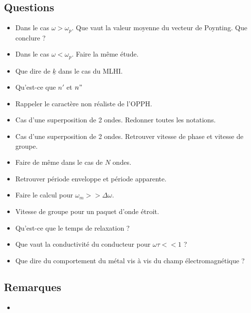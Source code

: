 \documentclass[a4paper, 11pt, hidelinks]{article}
\begin{document}
\subsection{Questions}



\begin{itemize}
    \item Dans le cas $\omega > \omega_p$. Que vaut la valeur moyenne du vecteur de Poynting. Que conclure ? \cite{Chapitre16}
    \item Dans le cas $\omega < \omega_p$. Faire la même étude. \cite{Chapitre16}
    \item Que dire de $\underline{k}$ dans le cas du MLHI. \cite{Chapitre16}
    \item Qu'est-ce que $n'$ et $n"$ \cite{Chapitre16}
    \item Rappeler le caractère non réaliste de l'OPPH. \cite{Chapitre16}
    \item Cas d'une superposition de 2 ondes. Redonner toutes les notations. \cite{Chapitre16}
    \item Cas d'une superposition de 2 ondes. Retrouver vitesse de phase et vitesse de groupe. \cite{Chapitre16}
    \item Faire de même dans le cas de $N$ ondes. \cite{Chapitre16}
    \item Retrouver période enveloppe et période apparente. \cite{Chapitre16}
    \item Faire le calcul pour $\omega_m >> \Delta \omega$. \cite{Chapitre16}
    \item Vitesse de groupe pour un paquet d'onde étroit. \cite{Chapitre16}
    \item Qu'est-ce que le temps de relaxation ? \cite{Chapitre17} 
    \item Que vaut la conductivité du conducteur pour $\omega \tau <<1$ ? \cite{Chapitre17}
    \item Que dire du comportement du métal vis à vis du champ électromagnétique ? \cite{Chapitre17} 
\end{itemize}


\subsection{Remarques}



\begin{itemize}
    \item 
\end{itemize}
\end{document}
